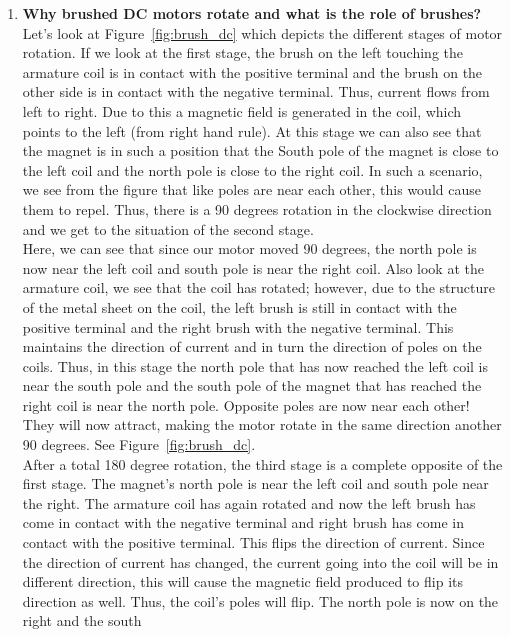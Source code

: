 \documentclass[12pt,a4paper]{report}
\begin{document}
\begin{enumerate}
	\item \textbf{Why brushed DC motors rotate and what is the role of brushes?}\\
		Let's look at Figure~\ref{fig:brush_dc} which depicts the different stages of motor rotation. 
		If we look at the first stage, the brush on the left touching the armature coil is in contact with the positive terminal and the 
		brush on the other side is in contact with the negative terminal. Thus, current flows from left to right. 
		Due to this a magnetic field is generated in the coil, which points to the left (from right hand rule). 
		At this stage we can also see that the magnet is in such a position that the South pole of the magnet is close to the left coil 
		and the north pole is close to the right coil. In such a scenario, we see from the figure that like poles are near each other, 
		this would cause them to repel. 
		Thus, there is a 90 degrees rotation in the clockwise direction and we get to the situation of the second stage.\\ 
		Here, we can see that since our motor moved 90 degrees, 
		the north pole is now near the left coil and south pole is near the right coil. Also look at the armature coil, we see that the 
		coil has rotated; however, due to the structure of the metal sheet on the coil, the left brush is still in contact with the 
		positive terminal and the right brush with the negative terminal. 
		This maintains the direction of current and in turn the direction of poles on the coils. Thus, in this stage the north pole that 
		has now reached the left coil is near the south pole and the south pole of the magnet that has reached the right coil is near the 
		north pole. Opposite poles are now near each other! They will now attract, making the motor rotate in the same direction another 
		90 degrees. See Figure~\ref{fig:brush_dc}.\\
		After a total 180 degree rotation, the third stage is a complete opposite of the first stage. The magnet's north pole is near the 
		left coil and south pole near the right. The armature coil has again rotated and now the left brush has come in contact with the 
		negative terminal and right brush has come in contact with the positive terminal. This flips the direction of current. Since the 
		direction of current has changed, the current going into the coil will be in different direction, this will cause the magnetic 
		field produced to flip its direction as well. Thus, the coil's poles will flip. The north pole is now on the right and the south 

\end{enumerate}
\end{document}
